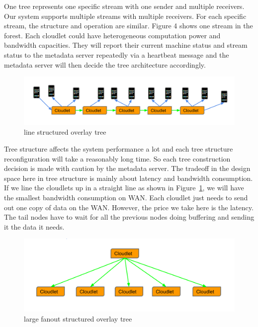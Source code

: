 \documentclass[letterpaper,twocolumn,10pt]{article}
\begin{document}
One tree represents one specific stream with one sender and multiple receivers. Our system supports multiple streams with multiple receivers. For each specific stream, the structure and operation are similar. Figure 4 shows one stream in the forest. Each cloudlet could have heterogeneous computation power and bandwidth capacities. They will report their current machine status and stream status to the metadata server repeatedly via a heartbeat message and the metadata server will then decide the tree architecture accordingly. 

\begin{figure}[t]
\begin{center}
\includegraphics[scale=0.3]{pic/line_structure.png}
\end{center}
\caption{line structured overlay tree}
\label{fig:line_structure}
\end{figure}

Tree structure affects the system performance a lot and each tree structure reconfiguration will take a reasonably long time. So each tree construction decision is made with caution by the metadata server. The tradeoff in the design space here in tree structure is mainly about latency and bandwidth consumption. If we line the cloudlets up in a straight line as shown in Figure~\ref{fig:line_structure}, we will have the smallest bandwidth consumption on WAN. Each cloudlet just needs to send out one copy of data on the WAN. However, the price we take here is the latency. The tail nodes have to wait for all the previous nodes doing buffering and sending it the data it needs. 

\begin{figure}[h]
\begin{center}
\includegraphics[scale=0.3]{pic/large_fanout.png}
\end{center}
\caption{large fanout structured overlay tree}
\label{fig:large_fanout}
\end{figure}
\end{document}
